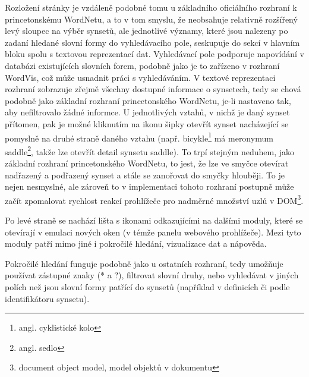 \documentclass[a4paper, 11pt, oneside]{book}
\newcommand\ex{\textsf}
\begin{document}
				Rozložení stránky je vzdáleně podobné tomu u základního oficiálního rozhraní k princetonskému WordNetu, a to v tom smyslu, že neobsahuje relativně rozšířený levý sloupec na výběr synsetů, ale jednotlivé významy, které jsou nalezeny po zadaní hledané slovní formy do vyhledávacího pole, seskupuje do sekcí v hlavním bloku spolu s textovou reprezentací dat. Vyhledávací pole podporuje napovídání v databázi existujících slovních forem, podobně jako je to zařízeno v rozhraní WordVis, což může usnadnit práci s vyhledáváním. V textové reprezentaci rozhraní zobrazuje zřejmě všechny dostupné informace o synsetech, tedy se chová podobně jako základní rozhraní princetonského WordNetu, je-li nastaveno tak, aby nefiltrovalo žádné informce. U jednotlivých vztahů, v nichž je daný synset přítomen, pak je možné kliknutím na ikonu šipky otevřít synset nacházející se pomyslně na druhé straně daného vztahu (např. \ex{bicykle}\footnote{angl. \ex{cyklistické kolo}} má meronymum \ex{saddle}\footnote{angl. \ex{sedlo}}, takže lze otevřít detail synsetu \ex{saddle}). To trpí stejným neduhem, jako základní rozhraní princetonského WordNetu, to jest, že lze ve smyčce otevírat nadřazený a podřazený synset a stále se zanořovat do smyčky hlouběji. To je nejen nesmyslné, ale zároveň to v implementaci tohoto rozhraní postupně může začít zpomalovat rychlost reakcí prohlížeče pro nadměrné množství uzlů v DOM\footnote{document object model, model objektů v dokumentu}.

				Po levé straně se nachází lišta s ikonami odkazujícími na dalšími moduly, které se otevírají v emulaci nových oken (v témže panelu webového prohlížeče). Mezi tyto moduly patří mimo jiné i pokročilé hledání, vizualizace dat a nápověda. 

				Pokročilé hledání funguje podobně jako u ostatních rozhraní, tedy umožňuje používat zástupné znaky (\ex{*} a \ex{?}), filtrovat slovní druhy, nebo vyhledávat v jiných polích než jsou slovní formy patřící do synsetů (například v definicích či podle identifikátoru synsetu). 
\end{document}
